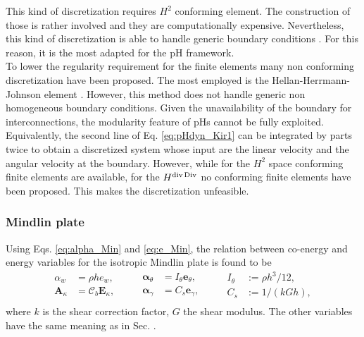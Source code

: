 This kind of discretization requires $H^2$ conforming element. The construction of those is rather involved \cite{argyris1968,bell1969} and they are computationally expensive. Nevertheless, this kind of discretization is able to handle generic boundary conditions \cite{gustafsson2018}. For this reason, it is the most adapted for the pH framework. \\

To lower the regularity requirement for the finite elements many non conforming discretization have been proposed. The most employed is the Hellan-Herrmann-Johnson element \cite{arnold1985mixed,blum1990}. However, this method does not handle generic non homogeneous boundary conditions. Given the unavailability of the boundary for interconnections, the modularity feature of pHs cannot be fully exploited. \\

Equivalently, the second line of Eq. \eqref{eq:pHdyn_Kir1} can be integrated by parts twice to obtain a discretized system whose input are the linear velocity and the angular velocity at the boundary. However, while for the $H^2$ space conforming finite elements are available, for the $H^{\operatorname{div}\operatorname*{Div}}$ no conforming finite elements have been proposed. This makes the discretization unfeasible. 



\subsubsection{Mindlin plate}
Using Eqs. \eqref{eq:alpha_Min} and \eqref{eq:e_Min}, the relation between co-energy and energy variables for the isotropic Mindlin plate is found to be
\begin{equation}
\begin{aligned}
\alpha_w &= \rho h e_w, \\
\bm{A}_{\kappa} &= \bm{\mathcal{C}}_b \bm{E}_\kappa,\\
\end{aligned} \qquad
\begin{aligned}
\bm{\alpha}_{\theta} &= I_\theta \bm{e}_\theta,\\
\bm{\alpha}_{\gamma} &= C_s \bm{e}_{\gamma}, \\
\end{aligned} \qquad
\begin{aligned}
I_\theta &:= {\rho h^3}/{12},\\
C_s &:= {1}/{(kGh)}, \\
\end{aligned}
\end{equation}
where $k$ is the shear correction factor, $G$ the shear modulus. The other variables have the same meaning as in Sec. . 

